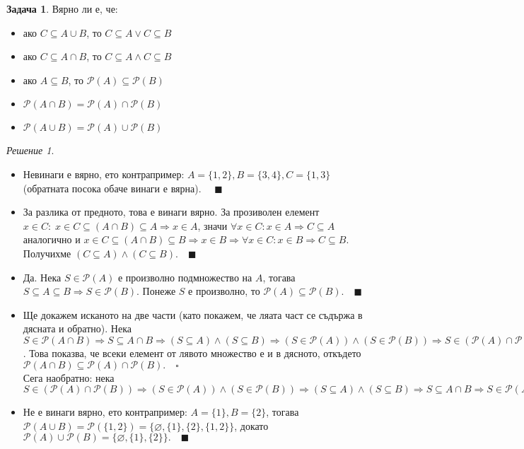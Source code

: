 \documentclass[10pt, a4paper]{article}
\theoremstyle{definition}
\newtheorem{problem}{Задача}
\theoremstyle{remark}
\newtheorem*{sol}{Решение}
\begin{document}
\hfill
\begin{problem}
    Вярно ли е, че:
    \begin{itemize}
        \item ако \(C\subseteq A\cup B\), то \(C\subseteq A \vee C\subseteq B\)
        \item ако \(C\subseteq A\cap B\), то \(C\subseteq A \wedge C\subseteq B\)
        \item ако \(A\subseteq B\), то \(\mathcal{P}(A)\subseteq\mathcal{P}(B)\)
        \item \(\mathcal{P}(A\cap B)=\mathcal{P}(A)\cap\mathcal{P}(B)\)
        \item \(\mathcal{P}(A\cup B)=\mathcal{P}(A)\cup\mathcal{P}(B)\)
    \end{itemize}
\end{problem}
\begin{sol}\hfill
    \begin{itemize}
        \item Невинаги е вярно, ето контрапример: \(A=\{1,2\}, B=\{3,4\}, C=\{1,3\}\) (обратната посока обаче винаги е вярна). \(\quad\blacksquare\)

        \item За разлика от предното, това е винаги вярно. За прозиволен елемент \(x\in C:\;x\in C\subseteq (A\cap B) \subseteq A \Rightarrow x\in A\), значи \(\forall x\in C: x\in A \Rightarrow C\subseteq A\) аналогично и \(x\in C\subseteq (A\cap B) \subseteq B \Rightarrow x\in B\Rightarrow\forall x\in C: x\in B \Rightarrow C\subseteq B\). Получихме \((C\subseteq A) \wedge (C\subseteq B).\quad\blacksquare\)
        
        \item Да. Нека \(S\in\mathcal{P}(A)\) е произволно подмножество на \(A\), тогава \(S\subseteq A\subseteq B \Rightarrow S\in\mathcal{P}(B)\). Понеже \(S\) е произволно, то \(\mathcal{P}(A)\subseteq\mathcal{P}(B).\quad\blacksquare\)
        
        \item Ще докажем исканото на две части (като покажем, че ляата част се съдържа в дясната и обратно). Нека \(S\in\mathcal{P}(A\cap B) \Rightarrow S\subseteq A\cap B\Rightarrow (S\subseteq A) \wedge (S\subseteq B)\Rightarrow (S\in\mathcal{P}(A)) \wedge (S\in\mathcal{P}(B))\Rightarrow S\in(\mathcal{P}(A)\cap\mathcal{P}(B))\). Това показва, че всеки елемент от лявото множество е и в дясното, откъдето \(\mathcal{P}(A\cap B)\subseteq\mathcal{P}(A)\cap\mathcal{P}(B).\quad\square\)\\
        Сега наобратно: нека \(S\in(\mathcal{P}(A)\cap\mathcal{P}(B)) \Rightarrow (S\in\mathcal{P}(A)) \wedge (S\in\mathcal{P}(B))\Rightarrow (S\subseteq A)\wedge (S\subseteq B)\Rightarrow S\subseteq A\cap B \Rightarrow S\in\mathcal{P}(A\cap B).\quad\blacksquare\)
        
        \item Не е винаги вярно, ето контрапример: \(A=\{1\}, B=\{2\}\), тогава \(\mathcal{P}(A\cup B)=\mathcal{P}(\{1,2\})=\{\varnothing, \{1\}, \{2\}, \{1,2\}\}\), докато \(\mathcal{P}(A)\cup\mathcal{P}(B)=\{\varnothing, \{1\},\{2\}\}.\quad\blacksquare\)
    \end{itemize}
\end{sol}
\end{document}
